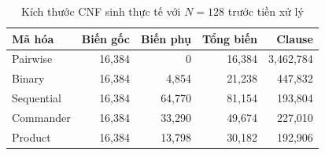 \begin{table}[htbp]
\centering\small
\caption{Kích thước CNF sinh thực tế với $N=128$ trước tiền xử lý}
\label{tab:counts}
\begin{tabular}{lrrrr}
\toprule
Mã hóa & Biến gốc & Biến phụ & Tổng biến & Clause \\
\midrule
Pairwise & 16,384 & 0 & 16,384 & 3,462,784 \\
Binary & 16,384 & 4,854 & 21,238 & 447,832 \\
Sequential & 16,384 & 64,770 & 81,154 & 193,804 \\
Commander & 16,384 & 33,290 & 49,674 & 227,010 \\
Product & 16,384 & 13,798 & 30,182 & 192,906 \\
\bottomrule
\end{tabular}
\end{table}
